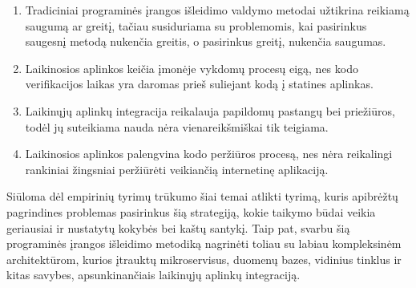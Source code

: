 \documentclass{VUMIFPSkursinis}
\begin{document}
\begin{enumerate}
  \item Tradiciniai programinės įrangos išleidimo valdymo metodai užtikrina reikiamą saugumą ar greitį, tačiau susiduriama su problemomis, kai pasirinkus saugesnį metodą nukenčia greitis, o pasirinkus greitį, nukenčia saugumas.
  \item Laikinosios aplinkos keičia įmonėje vykdomų procesų eigą, nes kodo verifikacijos laikas yra daromas prieš suliejant kodą į statines aplinkas.
  \item Laikinųjų aplinkų integracija reikalauja papildomų pastangų bei priežiūros, todėl jų suteikiama nauda nėra vienareikšmiškai tik teigiama.
  \item Laikinosios aplinkos palengvina kodo peržiūros procesą, nes nėra reikalingi rankiniai žingsniai peržiūrėti veikiančią internetinę aplikaciją.
\end{enumerate}

 
Siūloma dėl empirinių tyrimų trūkumo šiai temai atlikti tyrimą, kuris apibrėžtų pagrindines problemas pasirinkus šią strategiją, kokie taikymo būdai veikia geriausiai ir nustatytų kokybės bei kaštų santykį. Taip pat, svarbu šią programinės įrangos išleidimo metodiką nagrinėti toliau su labiau kompleksinėm architektūrom, kurios įtrauktų mikroservisus, duomenų bazes, vidinius tinklus ir kitas savybes, apsunkinančiais laikinųjų aplinkų integraciją.

\printbibliography[heading=bibintoc,category=cited] %


\appendix  %
\end{document}
